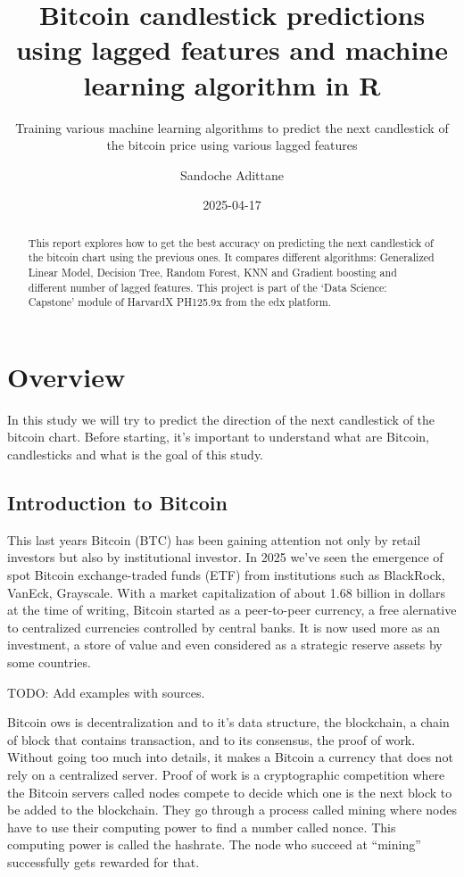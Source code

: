 \documentclass[
]{article}
\title{Bitcoin candlestick predictions using lagged features and machine
learning algorithm in R}
\subtitle{Training various machine learning algorithms to predict the
next candlestick of the bitcoin price using various lagged features}
\author{Sandoche Adittane}
\date{2025-04-17}
\begin{document}
\maketitle
\begin{abstract}
This report explores how to get the best accuracy on predicting the next
candlestick of the bitcoin chart using the previous ones. It compares
different algorithms: Generalized Linear Model, Decision Tree, Random
Forest, KNN and Gradient boosting and different number of lagged
features. This project is part of the `Data Science: Capstone' module of
HarvardX PH125.9x from the edx platform.
\end{abstract}

\newpage
\tableofcontents
\listoffigures
\listoftables
\newpage

\hypertarget{overview}{%
\section{Overview}\label{overview}}

In this study we will try to predict the direction of the next
candlestick of the bitcoin chart. Before starting, it's important to
understand what are Bitcoin, candlesticks and what is the goal of this
study.

\hypertarget{introduction-to-bitcoin}{%
\subsection{Introduction to Bitcoin}\label{introduction-to-bitcoin}}

This last years Bitcoin (BTC) has been gaining attention not only by
retail investors but also by institutional investor. In 2025 we've seen
the emergence of spot Bitcoin exchange-traded funds (ETF) from
institutions such as BlackRock, VanEck, Grayscale. With a market
capitalization of about 1.68 billion in dollars at the time of writing,
Bitcoin started as a peer-to-peer currency, a free alernative to
centralized currencies controlled by central banks. It is now used more
as an investment, a store of value and even considered as a strategic
reserve assets by some countries.

TODO: Add examples with sources.

Bitcoin ows is decentralization and to it's data structure, the
blockchain, a chain of block that contains transaction, and to its
consensus, the proof of work. Without going too much into details, it
makes a Bitcoin a currency that does not rely on a centralized server.
Proof of work is a cryptographic competition where the Bitcoin servers
called nodes compete to decide which one is the next block to be added
to the blockchain. They go through a process called mining where nodes
have to use their computing power to find a number called nonce. This
computing power is called the hashrate. The node who succeed at
``mining'' successfully gets rewarded for that.
\end{document}
